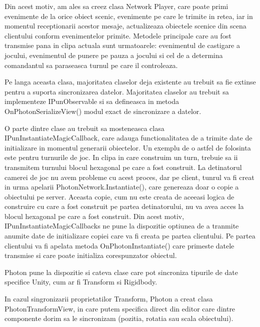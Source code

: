 \documentclass[12pt, a4paper]{article}
\begin{document}
	Din acest motiv, am ales sa creez clasa Network Player, care poate primi evenimente de la orice obiect scenic, evenimente pe care le trimite in retea, iar in momentul receptionarii acestor mesaje, actualizeaza obiectele scenice din scena clientului conform evenimentelor primite. Metodele principale care au fost transmise pana in clipa actuala sunt urmatoarele: evenimentul de castigare a jocului, evenimentul de punere pe pauza a jocului si cel de a determina comandantul sa paraseasca turnul pe care il controleaza.
	\newline
	
	Pe langa aceasta clasa, majoritatea claselor deja existente au trebuit sa fie extinse pentru a suporta sincronizarea datelor. Majoritatea claselor au trebuit sa implementeze IPunObservable si sa defineasca in metoda OnPhotonSerializeView() modul exact de sincronizare a datelor.
	\newline
	
	O parte dintre clase au trebuit sa mosteneasca clasa IPunInstantiateMagicCallback, care adauga functionalitatea de a trimite date de initializare in momentul generarii obiectelor. Un exemplu de o astfel de folosinta este pentru turnurile de joc. In clipa in care construim un turn, trebuie sa ii transmitem turnului blocul hexagonal pe care a fost construit. La detinatorul camerei de joc nu avem probleme cu acest proces, dar pe client, tunrul va fi creat in urma apelarii PhotonNetwork.Instantiate(), care genereaza doar o copie a obiectului pe server. Aceasta copie, cum nu este creata de aceeasi logica de construire cu care a fost construit pe partea detinatorului, nu va avea acces la blocul hexagonal pe care a fost construit. Din acest motiv, IPunInstantiateMagicCallbacks ne pune la dispozitie optiunea de a tranmite anumite date de initializare copiei care va fi creata pe partea clientului. Pe partea clientului va fi apelata metoda OnPhotonInstantiate() care primeste datele transmise si care poate initializa corespunzator obiectul.
	\newline
	
	Photon pune la dispozitie si cateva clase care pot sincroniza tipurile de date specifice Unity, cum ar fi Transform si Rigidbody. 
	\newline
	
	In cazul singronizarii proprietatilor Transform, Photon a creat clasa PhotonTransformView, in care putem specifica direct din editor care dintre componente dorim sa le sincronizam (pozitia, rotatia sau scala obiectului). 
	\newline
	
\end{document}
